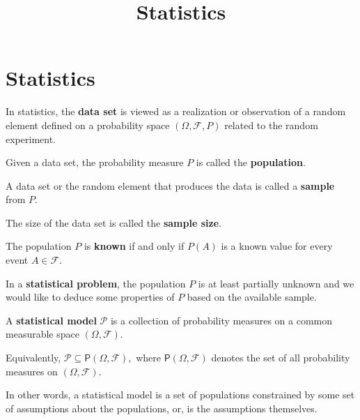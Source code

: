 \documentclass{article}
\title{Statistics}
\begin{document}
\section{Statistics}

\begin{definition}
	In statistics, the \textbf{data set} is viewed as a realization or observation of a \@{random element} defined on a \@{probability space} $(\Omega, \mathcal{F}, P)$ related to the \@{random} \@{experiment}.
\end{definition}

\begin{definition}[Population]
	Given a \@{data set}, the \@{probability measure} $P$ is called the \textbf{population}.
\end{definition}

\begin{definition}[Sample]
	A \@{data set} or the \@{random element} that produces the data is called a \textbf{sample} from $P.$
\end{definition}

\begin{definition}
	The size of the \@{data set} is called the \textbf{sample size}. 
\end{definition}

\begin{definition}[Known]
	The \@{population} $P$ is \textbf{known} if and only if $P(A)$ is a known \@{value} for every event $A \in \mathcal{F}.$
\end{definition}

\begin{definition}
	In a \textbf{statistical problem}, the \@{population} $P$ is at least partially unknown and we would like to deduce some properties of $P$ based on the available \@{sample}.
\end{definition}

\begin{definition}
	A \textbf{statistical model} $\mathcal{P}$ is a \@{collection} of \@{probability measures} on a common \@{measurable space} $(\Omega, \mathcal{F}).$

	Equivalently, $\mathcal{P} \subseteq \mathsf{P}(\Omega, \mathcal{F}),$ where $\mathsf{P}(\Omega, \mathcal{F})$ denotes the set of all probability measures on $(\Omega, \mathcal{F}).$

	In other words, a statistical model is a set of \@{populations} constrained by some set of assumptions about the populations, or, is the assumptions themselves.
\end{definition}
\end{document}
